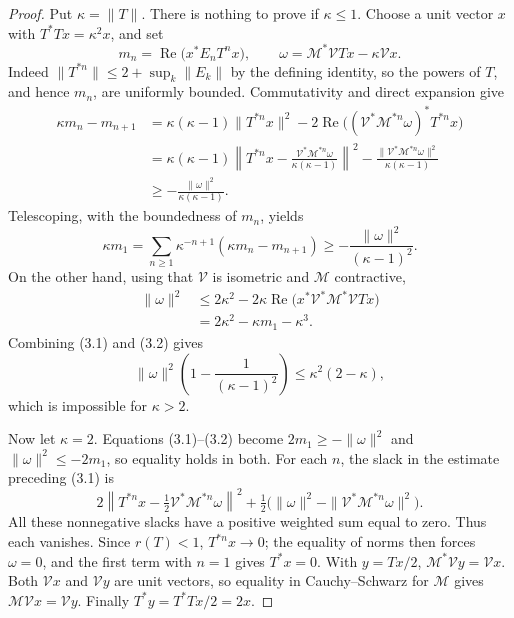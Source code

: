 \documentclass[11pt]{article}
\theoremstyle{definition}
\theoremstyle{remark}
\newcommand{\Rea}{\operatorname{Re}}
\begin{document}
\begin{proof}
Put \(\kappa=\|T\|\).  There is nothing to prove if \(\kappa\leq1\).  Choose a
unit vector \(x\) with \(T^*Tx=\kappa^2x\), and set
\[
 m_n=\Rea\bigl(x^*E_nT^nx\bigr),\qquad
 \omega=\mathcal M^*\mathcal VTx-\kappa\mathcal Vx.
\]
Indeed
\(\|T^{*n}\|\leq2+\sup_k\|E_k\|\) by the defining identity, so the powers of
\(T\), and hence \(m_n\), are uniformly bounded.  Commutativity and direct
expansion give
\begin{align*}
 \kappa m_n-m_{n+1}
 &=\kappa(\kappa-1)\|T^{*n}x\|^2
   -2\Rea\bigl((\mathcal V^*\mathcal M^{*n}\omega)^*T^{*n}x\bigr)\\
 &=\kappa(\kappa-1)
   \left\|T^{*n}x-\frac{\mathcal V^*\mathcal M^{*n}\omega}
   {\kappa(\kappa-1)}\right\|^2
   -\frac{\|\mathcal V^*\mathcal M^{*n}\omega\|^2}{\kappa(\kappa-1)}\\
 &\geq-\frac{\|\omega\|^2}{\kappa(\kappa-1)}.
\end{align*}
Telescoping, with the boundedness of \(m_n\), yields
\[
 \kappa m_1
 =\sum_{n\geq1}\kappa^{-n+1}(\kappa m_n-m_{n+1})
 \geq-\frac{\|\omega\|^2}{(\kappa-1)^2}.               \tag{3.1}
\]
On the other hand, using that \(\mathcal V\) is isometric and \(\mathcal M\) contractive,
\begin{align*}
 \|\omega\|^2
 &\leq2\kappa^2
 -2\kappa\Rea\bigl(x^*\mathcal V^*\mathcal M^*\mathcal VTx\bigr)\\
 &=2\kappa^2-\kappa m_1-\kappa^3.                     \tag{3.2}
\end{align*}
Combining (3.1) and (3.2) gives
\[
 \|\omega\|^2\left(1-\frac1{(\kappa-1)^2}\right)
 \leq\kappa^2(2-\kappa),
\]
which is impossible for \(\kappa>2\).

Now let \(\kappa=2\).  Equations (3.1)--(3.2) become
\(2m_1\geq-\|\omega\|^2\) and \(\|\omega\|^2\leq-2m_1\), so equality holds in both.
For each \(n\), the slack in the estimate preceding (3.1) is
\[
 2\left\|T^{*n}x-\tfrac12\mathcal V^*\mathcal M^{*n}\omega\right\|^2
 +\tfrac12\bigl(\|\omega\|^2-\|\mathcal V^*\mathcal M^{*n}\omega\|^2\bigr).
\]
All these nonnegative slacks have a positive weighted sum equal to zero.
Thus each vanishes.  Since \(r(T)<1\), \(T^{*n}x\to0\); the equality of norms
then forces \(\omega=0\), and the first term with \(n=1\) gives \(T^*x=0\).
With \(y=Tx/2\), \(\mathcal M^*\mathcal Vy=\mathcal Vx\).  Both
\(\mathcal Vx\) and \(\mathcal Vy\) are unit vectors, so equality in
Cauchy--Schwarz for \(\mathcal M\) gives \(\mathcal M\mathcal Vx=\mathcal Vy\).
Finally \(T^*y=T^*Tx/2=2x\).
\end{proof}
\end{document}
